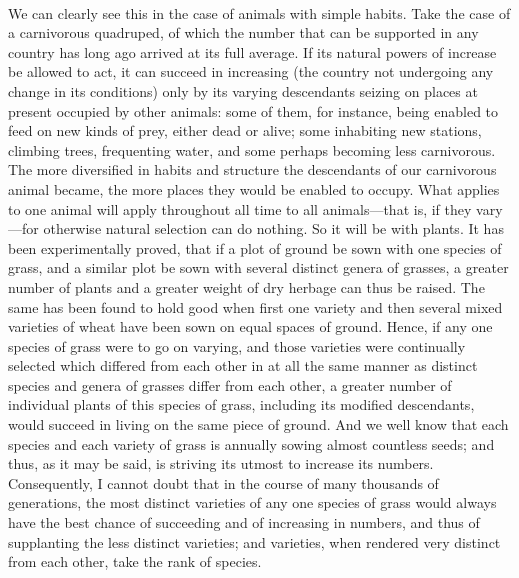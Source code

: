 \documentclass{article}
\begin{document}
\\
We can clearly see this in the case of animals with simple habits. Take the case of a carnivorous quadruped, of which the number that can be supported in any country has long ago arrived at its full average. If its natural powers of increase be allowed to act, it can succeed in increasing (the country not undergoing any change in its conditions) only by its varying descendants seizing on places at present occupied by other animals: some of them, for instance, being enabled to feed on new kinds of prey, either dead or alive; some inhabiting new stations, climbing trees, frequenting water, and some perhaps becoming less carnivorous. The more diversified in habits and structure the descendants of our carnivorous animal became, the more places they would be enabled to occupy. What applies to one animal will apply throughout all time to all animals—that is, if they vary—for otherwise natural selection can do nothing. So it will be with plants. It has been experimentally proved, that if a plot of ground be sown with one species of grass, and a similar plot be sown with several distinct genera of grasses, a greater number of plants and a greater weight of dry herbage can thus be raised. The same has been found to hold good when first one variety and then several mixed varieties of wheat have been sown on equal spaces of ground. Hence, if any one species of grass were to go on varying, and those varieties were continually selected which differed from each other in at all the same manner as distinct species and genera of grasses differ from each other, a greater number of individual plants of this species of grass, including its modified descendants, would succeed in living on the same piece of ground. And we well know that each species and each variety of grass is annually sowing almost countless seeds; and thus, as it may be said, is striving its utmost to increase its numbers. Consequently, I cannot doubt that in the course of many thousands of generations, the most distinct varieties of any one species of grass would always have the best chance of succeeding and of increasing in numbers, and thus of supplanting the less distinct varieties; and varieties, when rendered very distinct from each other, take the rank of species.\\
\end{document}
